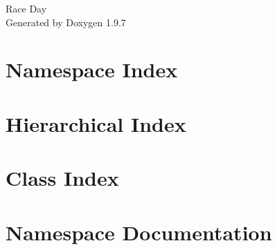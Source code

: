 \documentclass[twoside]{book}
\newcommand{\+}{\discretionary{\mbox{\scriptsize$\hookleftarrow$}}{}{}}
\newcommand{\clearemptydoublepage}{%
    \newpage{\pagestyle{empty}\cleardoublepage}%
  }
\begin{document}
  \raggedbottom
    \hypersetup{pageanchor=false,
                bookmarksnumbered=true,
                pdfencoding=unicode
               }
  \begin{titlepage}
  \vspace*{7cm}
  \begin{center}%
  {\Large Race Day}\\
  \vspace*{1cm}
  {\large Generated by Doxygen 1.9.7}\\
  \end{center}
  \end{titlepage}
  \clearemptydoublepage
  \tableofcontents
  \clearemptydoublepage
  \hypersetup{pageanchor=true}
\chapter{Namespace Index}

\chapter{Hierarchical Index}

\chapter{Class Index}

\chapter{Namespace Documentation}
























\end{document}
